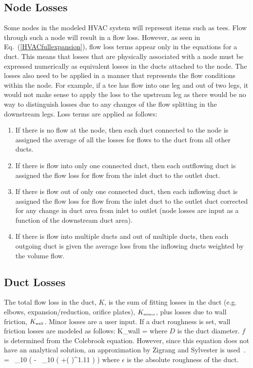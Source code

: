 \subsection{Node Losses}

Some nodes in the modeled HVAC system will represent items such as tees.  Flow through such a node will result in a flow loss.  However, as seen in Eq.~(\ref{HVACfullexpansion}), flow loss terms appear only in the equations for a duct.  This means that losses that are physically associated with a node must be expressed numerically as equivalent losses in the ducts attached to the node.  The losses also need to be applied in a manner that represents the flow conditions within the node.  For example, if a tee has flow into one leg and out of two legs, it would not make sense to apply the loss to the upstream leg as there would be no way to distinguish losses due to any changes of the flow splitting in the downstream legs.  Loss terms are applied as follows:

\begin{enumerate}
\item If there is no flow at the node, then each duct connected to the node is assigned the average of all the losses for flows to the duct from all other ducts.
\item If there is flow into only one connected duct, then each outflowing duct is assigned the flow loss for flow from the inlet duct to the outlet duct.
\item If there is flow out of only one connected duct, then each inflowing duct is assigned the flow loss for flow from the inlet duct to the outlet duct corrected for any change in duct area from inlet to outlet (node losses are input as a function of the downstream duct area).
\item If there is flow into multiple ducts and out of multiple ducts, then each outgoing duct is given the average loss from the inflowing ducts weighted by the volume flow.
\end{enumerate}

\subsection{Duct Losses}

The total flow loss in the duct, $K$, is the sum of fitting losses in the duct (e.g. elbows, expansion/reduction, orifice plates), $K_{\mbox{\tiny minor}}$, plus losses due to wall friction, $K_{\mbox{\tiny wall}}$.  Minor losses are a user input. If a duct roughness is set, wall friction losses are modeled as follows:
\be 
   K_{\mbox{\tiny wall}} =  
\ee
where $D$ is the duct diameter.  $f$ is determined from the Colebrook equation. However, since this equation does not have an analytical solution, an approximation by Zigrang and Sylvester is used~\cite{Zigrang:1}.
\be 
    \; =  \, \log_{10} \left(\; - \;  \, \log_{10} \left( +\left(  \right)^{1.11} \right) \right) 
\ee
where $\epsilon$ is the absolute roughness of the duct.

